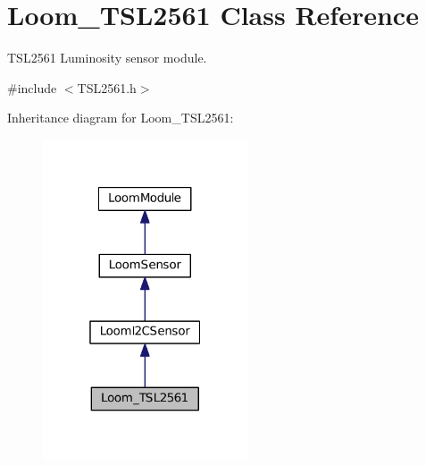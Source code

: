 \hypertarget{class_loom___t_s_l2561}{}\section{Loom\+\_\+\+T\+S\+L2561 Class Reference}
\label{class_loom___t_s_l2561}


T\+S\+L2561 Luminosity sensor module.  




{\ttfamily \#include $<$T\+S\+L2561.\+h$>$}



Inheritance diagram for Loom\+\_\+\+T\+S\+L2561\+:\nopagebreak
\begin{figure}[H]
\begin{center}
\leavevmode
\includegraphics[width=172pt]{class_loom___t_s_l2561__inherit__graph}
\end{center}
\end{figure}
